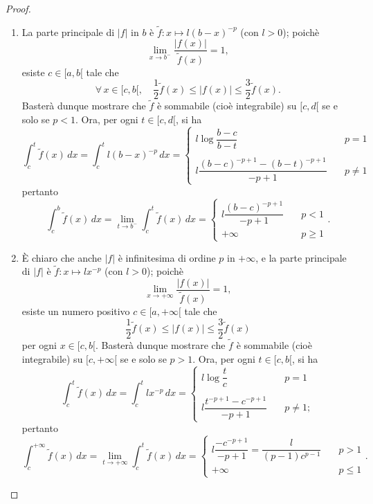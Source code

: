 \documentclass{article}
\theoremstyle{plain}
\theoremstyle{definition}
\theoremstyle{remark}
\begin{document}
\begin{proof}\hfill
    \begin{enumerate}
        \item La parte principale di $|f|$ in $b$ è $\tilde{f}:x\mapsto l(b-x)^{-p}$ (con $l>0$); poichè 
        \[\lim_{x\to b^-}\dfrac{|f(x)|}{\tilde{f}(x)}=1,\] esiste $c\in[a,b[$ tale che 
        \[\forall\,x\in [c,b[,\quad\dfrac{1}{2}\tilde{f}(x)\leq|f(x)|\leq\dfrac{3}{2}\tilde{f}(x).\]
        Basterà dunque mostrare che $\tilde{f}$ è sommabile (cioè integrabile) su $[c,d[$ se e solo se $p<1$. Ora, per ogni $t\in [c,d[$, si ha 
        \[
        \int_{c}^{t}\tilde{f}(x)\,dx=\int_{c}^{t}l(b-x)^{-p}\,dx=
        \begin{cases}
            l\log\dfrac{b-c}{b-t} & \quad p=1 \\\\
            l\dfrac{(b-c)^{-p+1}-(b-t)^{-p+1}}{-p+1} & \quad p\neq 1
        \end{cases}
        \]
        pertanto 
        \[\int_{c}^{b}\tilde{f}(x)\,dx=\lim_{t\to b^-}\int_{c}^{t}\tilde{f}(x)\,dx=
        \begin{cases}
            l\dfrac{(b-c)^{-p+1}}{-p+1}&\quad p<1\\
            +\infty&\quad p\geq1
        \end{cases}.\]
        \item È chiaro che anche $|f|$ è infinitesima di ordine $p$ in $+\infty$, e la parte principale di $|f|$ è $\tilde{f}:x\mapsto lx^{-p}$ (con $l>0$); poichè 
        \[\lim_{x\to+\infty}\dfrac{|f(x)|}{\tilde{f}(x)}=1,\] esiste un numero positivo 
        $c\in [a,+\infty[$ tale che \[\dfrac{1}{2}\tilde{f}(x)\leq |f(x)|\leq \dfrac{3}{2}\tilde{f}(x)\] per ogni $x\in [c,b[$.
        Basterà dunque mostrare che $\tilde{f}$ è sommabile (cioè integrabile) su $[c,+\infty[$ se e solo se $p>1$. Ora, per ogni $t\in [c,b[$, si ha 
        \[\int_{c}^{t}\tilde{f}(x)\,dx=\int_{c}^{t}lx^{-p}\,dx=\begin{cases}
            l\log\dfrac{t}{c}&\quad p=1\\\\
            l\dfrac{t^{-p+1}-c^{-p+1}}{-p+1}&\quad p\neq1;
        \end{cases}\]
        pertanto 
        \[\int_{c}^{+\infty}\tilde{f}(x)\,dx=\lim_{t\to+\infty}\int_{c}^{t}\tilde{f}(x)\,dx=\begin{cases}
            l\dfrac{-c^{-p+1}}{-p+1}=\dfrac{l}{(p-1)c^{p-1}}&\quad p>1\\
            +\infty&\quad p\leq1
        \end{cases}.\]
    \end{enumerate}
\end{proof}
 
\end{document}
